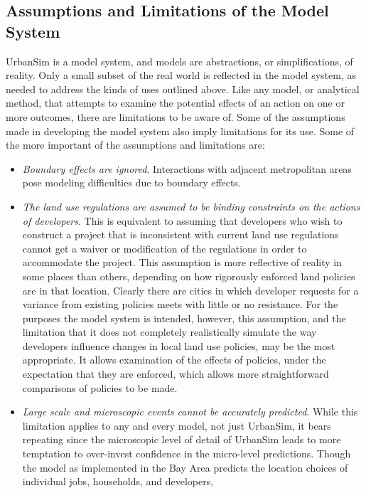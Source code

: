 \subsection{Assumptions and Limitations of the Model System}

UrbanSim is a model system, and models are abstractions, or simplifications,
of reality. Only a small subset of the real world is reflected in
the model system, as needed to address the kinds of uses outlined
above. Like any model, or analytical method, that attempts to examine
the potential effects of an action on one or more outcomes, there
are limitations to be aware of. Some of the assumptions made in developing
the model system also imply limitations for its use. Some of the more
important of the assumptions and limitations are:

\begin{itemize}
\item \emph{Boundary effects are ignored}. Interactions with adjacent metropolitan areas pose
modeling difficulties due to boundary effects.
\item \emph{The land use regulations are assumed to be binding constraints
on the actions of developers}. This is equivalent to assuming that
developers who wish to construct a project that is inconsistent with
current land use regulations cannot get a waiver or modification of
the regulations in order to accommodate the project. This assumption
is more reflective of reality in some places than others, depending
on how rigorously enforced land policies are in that location. Clearly
there are cities in which developer requests for a variance from existing
policies meets with little or no resistance. For the purposes the
model system is intended, however, this assumption, and the limitation
that it does not completely realistically simulate the way developers
influence changes in local land use policies, may be the most appropriate.
It allows examination of the effects of policies, under the expectation
that they are enforced, which allows more straightforward comparisons
of policies to be made.
\item \emph{Large scale and microscopic events cannot be accurately predicted}.
While this limitation applies to any and every model, not just UrbanSim,
it bears repeating since the microscopic level of detail of UrbanSim
leads to more temptation to over-invest confidence in the micro-level
predictions. Though the model as implemented in the Bay Area predicts
the location choices of individual jobs, households, and developers,

\end{itemize}
